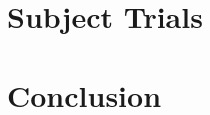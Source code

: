 \documentclass[11pt]{gsasthesis} %
\begin{document}
\chapter{Subject Trials}\label{ch:4}


\chapter*{Conclusion}\label{ch:concl}




\begin{singlespacing}
  \renewcommand{\bibname}{References}

  
  
\end{singlespacing}


\end{document}
